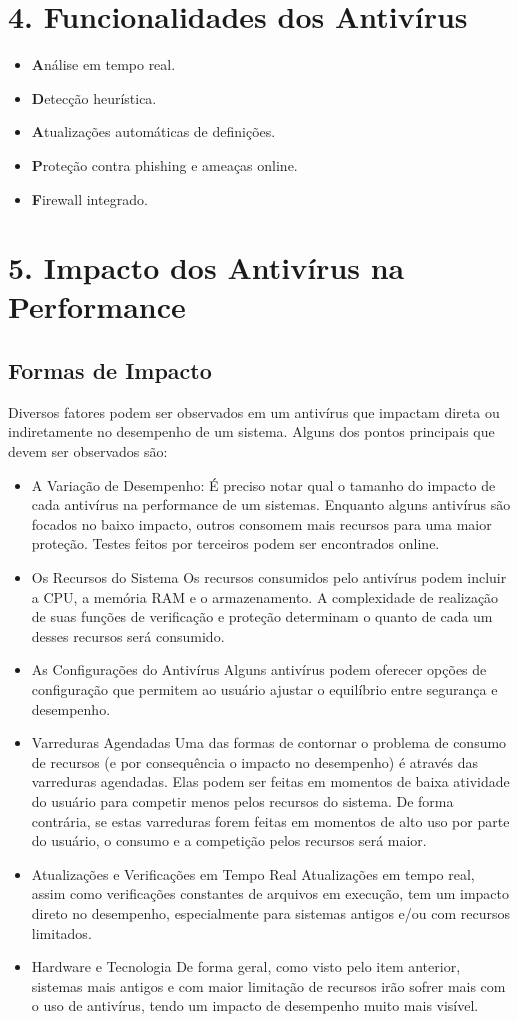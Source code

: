 \documentclass[10pt,conference,twocolumn]{article}
\begin{document}
\section* {4. Funcionalidades dos Antivírus}
 \begin{itemize}
\item \textbf Análise em tempo real.
\item \textbf Detecção heurística.
\item \textbf Atualizações automáticas de definições.
\item \textbf Proteção contra phishing e ameaças online.
\item \textbf Firewall integrado.
\end{itemize}

\section* {5. Impacto dos Antivírus na Performance}
\subsection*{Formas de Impacto}
Diversos fatores podem ser observados em um antivírus que impactam direta ou indiretamente no desempenho de um sistema. Alguns dos pontos principais que devem ser observados são:

\begin{itemize}
\item
A Variação de Desempenho:
É preciso notar qual o tamanho do impacto de cada antivírus na performance de um sistemas. Enquanto alguns antivírus são focados no baixo impacto, outros consomem mais recursos para uma maior proteção. Testes feitos por terceiros podem ser encontrados online.
\item
Os Recursos do Sistema
Os recursos consumidos pelo antivírus podem incluir a CPU, a memória RAM e o armazenamento. A complexidade de realização de suas funções de verificação e proteção determinam o quanto de cada um desses recursos será consumido.
\item
As Configurações do Antivírus
Alguns antivírus podem oferecer opções de configuração que permitem ao usuário ajustar o equilíbrio entre segurança e desempenho.
\item
Varreduras Agendadas
Uma das formas de contornar o problema de consumo de recursos (e por consequência o impacto no desempenho) é através das varreduras agendadas. Elas podem ser feitas em momentos de baixa atividade do usuário para competir menos pelos recursos do sistema. De forma contrária, se estas varreduras forem feitas em momentos de alto uso por parte do usuário, o consumo e a competição pelos recursos será maior.
\item
Atualizações e Verificações em Tempo Real
Atualizações em tempo real, assim como verificações constantes de arquivos em execução, tem um impacto direto no desempenho, especialmente para sistemas antigos e/ou com recursos limitados.
\item
Hardware e Tecnologia
De forma geral, como visto pelo item anterior, sistemas mais antigos e com maior limitação de recursos irão sofrer mais com o uso de antivírus, tendo um impacto de desempenho muito mais visível.
\end{itemize}
\end{document}
